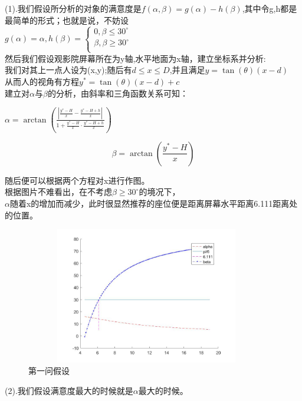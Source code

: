 \documentclass[a4paper,20pt]{article}
\begin{document}
\begin{itemize}
          \par \noindent (1).我们假设所分析的对象的满意度是$f(\alpha,\beta)=g(\alpha)-h(\beta)$,其中令g,h都是最简单的形式；也就是说，不妨设
          \\$g(\alpha)=\alpha,h(\beta)=\left\{\begin{matrix}
              0,\beta\leq 30^\circ      \\
              \beta,\beta \geq 30^\circ \\
          \end{matrix}\right.$
              \\然后我们假设观影院屏幕所在为y轴,水平地面为x轴，建立坐标系并分析:
              \\我们对其上一点人设为(x,y);随后有$d\leq x \leq D$,并且满足$y=\tan(\theta)(x-d)$
              \\从而人的视角有方程$y^*=\tan(\theta)(x-d)+c$
              \\建立对$\alpha$与$\beta$的分析，由斜率和三角函数关系可知：
              \begin{center}
                  $\alpha=\arctan\left(\frac{|\frac{y^*-H}{x}-\frac{y^*-H+h}{x}|}{1+\frac{y^*-H}{x}\cdot \frac{y^*-H+h}{x}} \right)$
              \end{center}
              $$ \beta = \arctan\left(\frac{y^*-H}{x}\right)$$
              \par \noindent 随后便可以根据两个方程对x进行作图。
              \\根据图片不难看出，在不考虑$\beta \geq 30^\circ$的境况下，
              \\$\alpha$随着x的增加而减少，此时很显然推荐的座位便是距离屏幕水平距离6.111距离处的位置。
          \begin{figure}[h]
              \centering
              \includegraphics[width=300pt,height=170pt]{Homework7_1.jpg}
              \caption{第一问假设}
          \end{figure}
          \par \noindent (2).我们假设满意度最大的时候就是$\alpha$最大的时候。

\end{itemize}
\end{document}
